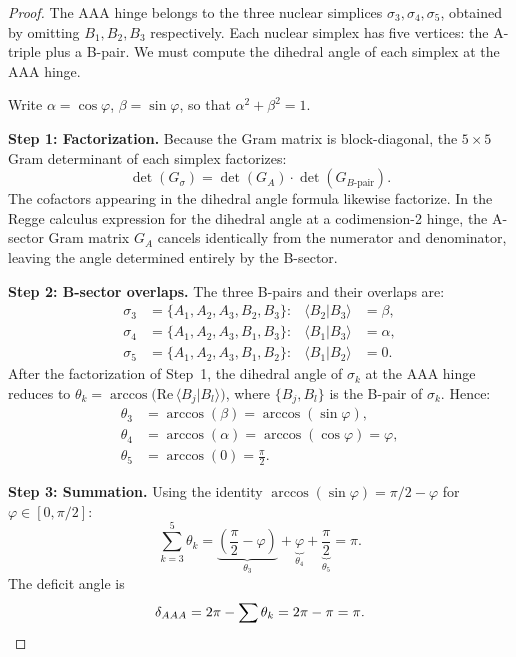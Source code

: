 \documentclass[12pt]{article}
\theoremstyle{remark}
\theoremstyle{definition}
\begin{document}
\begin{proof}
The AAA hinge belongs to the three nuclear simplices
$\sigma_3, \sigma_4, \sigma_5$, obtained by omitting $B_1, B_2, B_3$
respectively.  Each nuclear simplex has five vertices: the A-triple
plus a B-pair.  We must compute the dihedral angle of each simplex at
the AAA hinge.

Write $\alpha = \cos\varphi$, $\beta = \sin\varphi$, so that
$\alpha^2 + \beta^2 = 1$.

\medskip\noindent\textbf{Step 1: Factorization.}
Because the Gram matrix is block-diagonal, the $5\times 5$ Gram
determinant of each simplex factorizes:
\[
\det(G_\sigma) = \det(G_A) \cdot \det(G_{B\text{-pair}}).
\]
The cofactors appearing in the dihedral angle formula likewise
factorize.  In the Regge calculus expression for the dihedral angle at
a codimension-2 hinge, the A-sector Gram matrix $G_A$ cancels
identically from the numerator and denominator, leaving the angle
determined entirely by the B-sector.

\medskip\noindent\textbf{Step 2: B-sector overlaps.}
The three B-pairs and their overlaps are:
\begin{align}
\sigma_3 &= \{A_1, A_2, A_3, B_2, B_3\}:
  &\langle B_2 | B_3 \rangle &= \beta, \label{eq:overlap_23}\\
\sigma_4 &= \{A_1, A_2, A_3, B_1, B_3\}:
  &\langle B_1 | B_3 \rangle &= \alpha, \label{eq:overlap_13}\\
\sigma_5 &= \{A_1, A_2, A_3, B_1, B_2\}:
  &\langle B_1 | B_2 \rangle &= 0. \label{eq:overlap_12}
\end{align}
After the factorization of Step~1, the dihedral angle of $\sigma_k$
at the AAA hinge reduces to $\theta_k = \arccos\bigl(\text{Re}\,
\langle B_j | B_l \rangle\bigr)$, where $\{B_j, B_l\}$ is the B-pair
of $\sigma_k$.  Hence:
\begin{align}
\theta_3 &= \arccos(\beta) = \arccos(\sin\varphi), \\
\theta_4 &= \arccos(\alpha) = \arccos(\cos\varphi) = \varphi, \\
\theta_5 &= \arccos(0) = \frac{\pi}{2}.
\end{align}

\medskip\noindent\textbf{Step 3: Summation.}
Using the identity $\arccos(\sin\varphi) = \pi/2 - \varphi$ for
$\varphi \in [0, \pi/2]$:
\begin{equation}
\sum_{k=3}^{5} \theta_k
= \underbrace{\left(\frac{\pi}{2} - \varphi\right)}_{\theta_3}
+ \underbrace{\varphi}_{\theta_4}
+ \underbrace{\frac{\pi}{2}}_{\theta_5}
= \pi.
\end{equation}
The deficit angle is
\begin{equation}
\delta_{AAA} = 2\pi - \sum\theta_k = 2\pi - \pi = \pi. \qedhere
\end{equation}
\end{proof}
\end{document}
